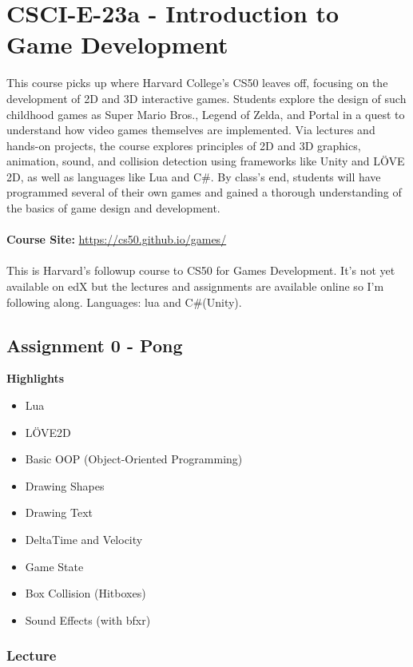 \section{CSCI-E-23a - Introduction to Game Development}

This course picks up where Harvard College’s CS50 leaves off, focusing on the development of 2D and 3D interactive games. Students explore the design 
of such childhood games as Super Mario Bros., Legend of Zelda, and Portal in a quest to understand how video games themselves are implemented. Via lectures and hands-on projects, the course explores principles of 2D and 3D graphics, animation, sound, and collision detection using frameworks like Unity and LÖVE 2D, as well as languages like Lua and C\#. By class’s end, students will have programmed several of their own games and gained a thorough understanding of the basics of game design and development.
\\\\
\textbf{Course Site:} \url{https://cs50.github.io/games/}
\\\\
This is Harvard's followup course to CS50 for Games Development. It's not yet available on edX but the lectures and assignments are available online so I'm following along. Languages: lua and C\#(Unity).
\newpage

\subsection{Assignment 0 - Pong}

\begin{featurebox}
\textbf{Highlights}
\begin{itemize}
\item Lua
\item LÖVE2D
\item Basic OOP (Object-Oriented Programming)
\item Drawing Shapes
\item Drawing Text
\item DeltaTime and Velocity
\item Game State
\item Box Collision (Hitboxes)
\item Sound Effects (with bfxr)
\end{itemize}
\end{featurebox}

\subsubsection{Lecture}


